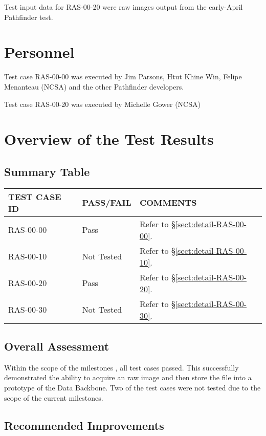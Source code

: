 \documentclass[DM,lsstdraft,STR,toc]{lsstdoc}
\begin{document}
Test input data for RAS-00-20 were raw images output from the early-April Pathfinder test.

\section{Personnel}
\label{sect:personnel}

Test case RAS-00-00 was executed by Jim Parsons, Htut Khine Win, Felipe Menanteau (NCSA) and the other Pathfinder developers.

Test case RAS-00-20  was executed by Michelle Gower (NCSA)

\newpage

\section{Overview of the Test Results}
\label{sect:overview}

\subsection{Summary Table}
\label{sect:summarytable}

\begin{longtable} {|p{}|p{}|p{}|}\hline
{\bf TEST CASE ID} & {\bf PASS/FAIL} & {\bf COMMENTS} \\\hline
RAS-00-00 & Pass & Refer to \S\ref{sect:detail-RAS-00-00}. \\\hline
RAS-00-10 & Not Tested & Refer to \S\ref{sect:detail-RAS-00-10}. \\\hline
RAS-00-20 & Pass & Refer to \S\ref{sect:detail-RAS-00-20}. \\\hline
RAS-00-30 & Not Tested & Refer to \S\ref{sect:detail-RAS-00-30}. \\\hline
\end{longtable}

\subsection{Overall Assessment}
\label{sect:overallassessment}

Within the scope of the milestones \milestoneId{}, all test cases passed.
This successfully demonstrated the ability to acquire an raw image and then store the file into a
prototype of the Data Backbone. Two of the test cases were not tested due to the scope of the
current milestones.


\subsection{Recommended Improvements}
\label{sect:recommendations}
\end{document}
